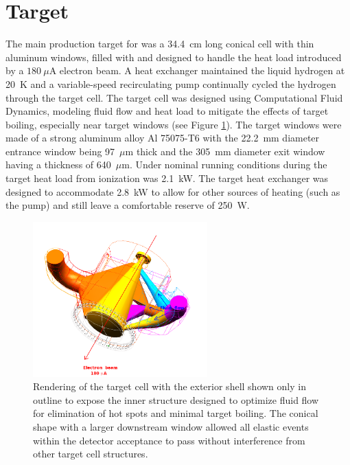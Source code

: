 \section{\label{sctn:target}Target}
The main production target for \Qs was a 34.4~cm long conical cell with thin aluminum windows, filled with \LHs and designed to handle the heat load introduced by a $180~\mu$A electron beam. A heat exchanger maintained the liquid hydrogen at 20~K and a variable-speed recirculating pump continually cycled the hydrogen through the target cell. The target cell was designed using Computational Fluid Dynamics, modeling fluid flow and heat load to mitigate the effects of target boiling, especially near target windows (see Figure \ref{fig:target_cell}). The target windows were made of a strong aluminum alloy Al 75075-T6 with the 22.2~mm diameter entrance window being 97~$\mu$m thick and the 305~mm diameter exit window having a thickness of 640~$\mu$m. Under nominal running conditions during \Qs the target heat load from ionization was 2.1~kW. The target heat exchanger was designed to accommodate 2.8~kW to allow for other sources of heating (such as the pump) and still leave a comfortable reserve of 250~W. 

\begin{figure}[ht]
\centering
\includegraphics[width=0.6\textwidth]{Pictures/target_cell.png}
\caption{Rendering of the target cell with the exterior shell shown only in outline to expose the inner structure designed to optimize fluid flow for elimination of hot spots and minimal target boiling. The conical shape with a larger downstream window allowed all elastic events within the detector acceptance to pass without interference from other target cell structures.}
\label{fig:target_cell}
\end{figure} 

